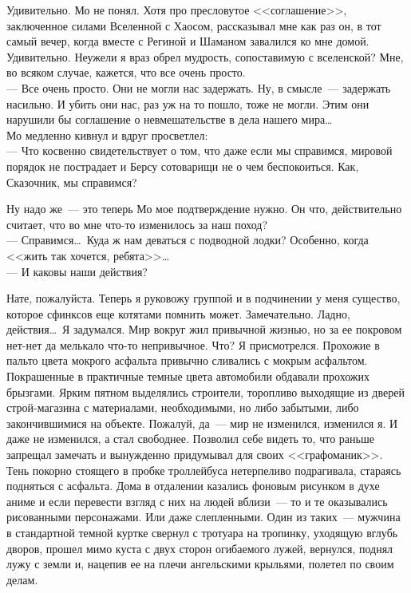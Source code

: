 Удивительно. Мо не понял. Хотя про пресловутое <<соглашение>>, заключенное 
силами Вселенной с Хаосом, рассказывал мне как раз он, в тот самый вечер, когда вместе 
с Региной и Шаманом завалился ко мне домой. Удивительно. Неужели я враз обрел 
мудрость, сопоставимую с вселенской? Мне, во всяком случае, кажется, что все 
очень просто.\\
--- Все очень просто. Они не могли нас задержать. Ну, в смысле~--- задержать 
насильно. И убить они нас, раз уж на то пошло, тоже не могли. Этим они нарушили 
бы соглашение о невмешательстве в дела нашего мира\ldots\\
Мо медленно кивнул и вдруг просветлел:\\
--- Что косвенно свидетельствует о том, что даже если мы справимся, мировой 
порядок не пострадает и Берсу сотоварищи не о чем беспокоиться. Как, Сказочник, 
мы справимся?

Ну надо же~--- это теперь Мо мое подтверждение нужно. Он что, действительно 
считает, что во мне что-то изменилось за наш поход?\\
--- Справимся\ldots\ Куда ж нам деваться с подводной лодки? Особенно, когда 
<<жить так хочется, ребята>>\ldots\\
--- И каковы наши действия?


Нате, пожалуйста. Теперь я руковожу группой и в подчинении у меня существо, 
которое сфинксов еще котятами помнить может. Замечательно. Ладно, 
действия\ldots\ Я задумался. Мир вокруг жил привычной жизнью, но за ее покровом нет-нет да 
мелькало что-то непривычное. Что? Я присмотрелся. Прохожие в пальто цвета 
мокрого асфальта привычно сливались с мокрым асфальтом. Покрашенные в 
практичные темные цвета автомобили обдавали прохожих брызгами. Ярким пятном выделялись 
строители, торопливо выходящие из дверей строй-магазина с материалами, 
необходимыми, но либо забытыми, либо закончившимися на объекте. Пожалуй, да~--- 
мир не изменился, изменился я. И даже не изменился, а стал свободнее. Позволил 
себе видеть то, что раньше запрещал замечать и вынужденно придумывал для своих 
<<графоманик>>. Тень покорно стоящего в пробке троллейбуса нетерпеливо 
подрагивала, стараясь подняться с асфальта. Дома в отдалении казались фоновым 
рисунком в духе аниме и если перевести взгляд с них на людей вблизи~--- то и те 
оказывались рисованными персонажами. Или даже слепленными. Один из таких~--- 
мужчина в стандартной темной куртке свернул с тротуара на тропинку, уходящую 
вглубь дворов, прошел мимо куста с двух сторон огибаемого лужей, вернулся, 
поднял лужу с земли и, нацепив ее на плечи ангельскими крыльями, полетел по 
своим делам.

